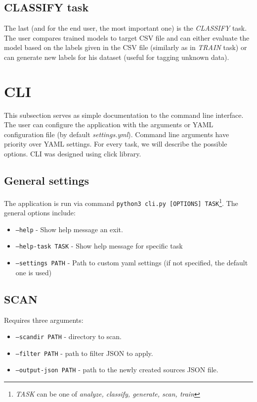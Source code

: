 \subsection{CLASSIFY task}

The last (and for the end user, the most important one) is the \textit{CLASSIFY} task. The user compares trained models to target CSV file and can either evaluate the model based on the labels given in the CSV file (similarly as in \textit{TRAIN} task) or can generate new labels for his dataset (useful for tagging unknown data).

\section{CLI}
\label{cli}

This subsection serves as simple documentation to the command line interface. The user can configure the application with the arguments or YAML configuration file (by default \textit{settings.yml}). Command line arguments have priority over YAML settings. For every task, we will describe the possible options. CLI was designed using click library.

\subsection*{General settings}

The application is run via command \texttt{python3 cli.py [OPTIONS] TASK}\footnote{\textit{TASK} can be one of \textit{analyze, classify, generate, scan, train}}. The general options include:

\begin{itemize}

\item \texttt{--help} - Show help message an exit.
\item \texttt{--help-task TASK} - Show help message for specific task
\item \texttt{--settings PATH} - Path to custom yaml settings (if not specified, the default one is used)

\end{itemize}

\subsection*{SCAN}

\noindent
Requires three arguments:

\begin{itemize}

\item \texttt{--scandir PATH} - directory to scan.
\item \texttt{--filter PATH} - path to filter JSON to apply.
\item \texttt{--output-json PATH} - path to the newly created sources JSON file.

\end{itemize}

